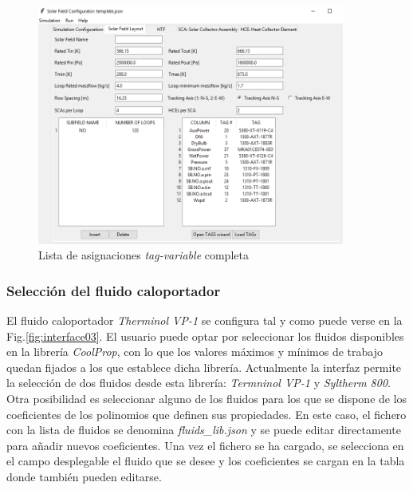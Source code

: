 \begin{figure}[H]
\includegraphics[width=0.9\textwidth, height=0.7\textwidth]{images/tagscargados.png}
\caption{Lista de asignaciones \emph{tag-variable} completa}
\label{fig:carga2}
\end{figure}

\subsubsection{Selección del fluido caloportador} 

El fluido caloportador \emph{Therminol VP-1} se configura tal y como puede verse en la Fig.\ref{fig:interface03}. El usuario puede optar por seleccionar los fluidos disponibles en la librería \emph{CoolProp}, con lo que los valores máximos y mínimos de trabajo quedan fijados a los que establece dicha librería. Actualmente la interfaz permite la selección de dos fluidos desde esta librería: \emph{Termninol VP-1} y \emph{Syltherm 800}. Otra posibilidad es seleccionar alguno de los fluidos para los que se dispone de los coeficientes de los polinomios que definen sus propiedades. En este caso, el fichero con la lista de fluidos se denomina \emph{fluids\_lib.json} y se puede editar directamente para añadir nuevos coeficientes. Una vez el fichero se ha cargado, se selecciona en el campo desplegable el fluido que se desee y los coeficientes se cargan en la tabla donde también pueden editarse.

